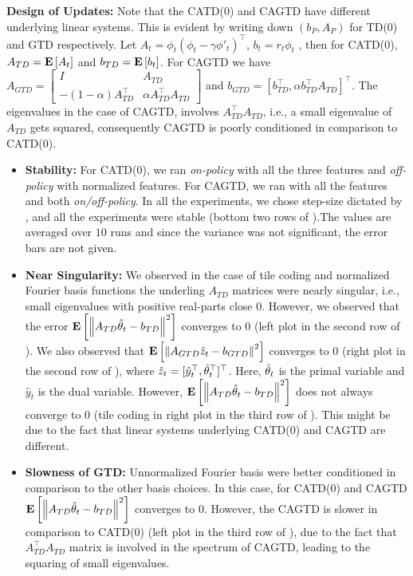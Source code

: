 \textbf{Design of Updates:} Note that the CATD(0) and CAGTD have different underlying linear systems. This is evident by writing down $(b_P,A_P)$ for TD(0) and GTD respectively. Let $A_t=\phi_t(\phi_t-\gamma\phi'_t)^\top$, $b_t=r_t \phi_t$ , then for CATD(0), $A_{TD}=\mathbf{E}\left[A_t\right]$ and $b_{TD}=\mathbf{E}\left[b_t\right]$.  For CAGTD we have $A_{GTD}=\left[\begin{matrix}I & A_{TD} \\ -(1-\alpha )A_{TD}^\top &\alpha A_{TD}^\top A_{TD}\end{matrix}\right]$ and $b_{GTD}=[b_{TD}^\top,\alpha b_{TD}^\top A_{TD}]^\top$. The eigenvalues in the case of  CAGTD, involves $A_{TD}^\top A_{TD}$, i.e., a small eigenvalue of $A_{TD}$ gets squared, consequently CAGTD is poorly conditioned in comparison to CATD(0).

\begin{itemize}[leftmargin=*]
\item \textbf{Stability:} For CATD(0), we ran  \emph{on-policy} with all the three features and \emph{off-policy} with normalized features. For CAGTD, we ran with all the features and both \emph{on/off-policy}. In all the experiments, we chose step-size dictated by , and all the experiments were stable (bottom two rows of ).The values are averaged over $10$ runs and since the variance was not significant, the error bars are not given.
\item \textbf{Near Singularity: } We observed in the case of tile coding and normalized Fourier basis functions the underling $A_{TD}$ matrices were nearly singular, i.e., small eigenvalues with positive real-parts close $0$. However, we observed that the error $\mathbf{E}\left[\left\| A_{TD}\hat{\theta}_t -b_{TD}\right\|^2\right]$ converges to $0$ (left plot in the second row of ). We also observed that $\mathbf{E}\left[\left\| A_{GTD}\hat{z}_t-b_{GTD}\right\|^2\right]$ converges to $0$ (right plot in the second row of ), where $\hat{z}_t=[\hat{y}_t^\top,\hat{\theta}_t^\top]^\top$. Here, $\hat{\theta}_t$ is the primal variable and $\hat{y}_t$ is the dual variable. However, $\mathbf{E}\left[\left\| A_{TD}\hat{\theta}_t-b_{TD}\right\|^2\right]$ does not always converge to $0$ (tile coding in right plot in the third row of ). This might be due to the fact that linear systems underlying CATD(0) and CAGTD are different. 
\item \textbf{Slowness of GTD:} Unnormalized Fourier basis were better conditioned in comparison to the other basis choices. In this case, for CATD(0) and CAGTD $\mathbf{E}\left[\left\| A_{TD}\hat{\theta}_t -b_{TD}\right\|^2\right]$ converges to $0$. However, the CAGTD is slower in comparison to CATD(0) (left plot in the third row of ), due to the fact that $A^\top_{TD}A_{TD}$ matrix is involved in the spectrum of CAGTD, leading to the squaring of small eigenvalues.
\end{itemize}

